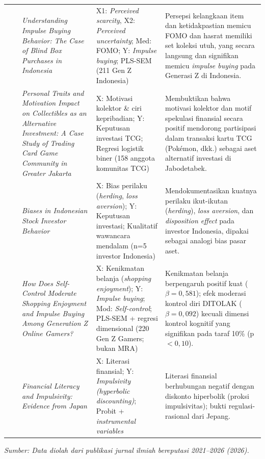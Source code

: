 \documentclass[12pt,a4paper]{article}
\numberwithin{equation}{section}
\numberwithin{table}{section}
\numberwithin{figure}{section}
\begin{document}
\begin{longtable}{>{\centering\arraybackslash}p{0.5cm} >{\raggedright\arraybackslash}p{2.3cm} >{\raggedright\arraybackslash}p{3.2cm} >{\raggedright\arraybackslash}p{2.6cm} >{\raggedright\arraybackslash}p{3.9cm}}
\addlinespace[4pt]
6 & \citet{dewi2026understanding} & \emph{Understanding Impulse Buying Behavior: The Case of Blind Box Purchases in Indonesia} & X1: \emph{Perceived scarcity}, X2: \emph{Perceived uncertainty}; Med: FOMO; Y: \emph{Impulse buying}; PLS-SEM (211 Gen Z Indonesia) & Persepsi kelangkaan item dan ketidakpastian memicu FOMO dan hasrat memiliki set koleksi utuh, yang secara langsung dan signifikan memicu \emph{impulse buying} pada Generasi Z di Indonesia. \\
\addlinespace[4pt]
7 & \citet{aryadi2024personal} & \emph{Personal Traits and Motivation Impact on Collectibles as an Alternative Investment: A Case Study of Trading Card Game Community in Greater Jakarta} & X: Motivasi kolektor \& ciri kepribadian; Y: Keputusan investasi TCG; Regresi logistik biner (158 anggota komunitas TCG) & Membuktikan bahwa motivasi kolektor dan motif spekulasi finansial secara positif mendorong partisipasi dalam transaksi kartu TCG (Pok\'emon, dkk.) sebagai aset alternatif investasi di Jabodetabek. \\
\addlinespace[4pt]
8 & \citet{colline2024biases} & \emph{Biases in Indonesian Stock Investor Behavior} & X: Bias perilaku (\emph{herding}, \emph{loss aversion}); Y: Keputusan investasi; Kualitatif wawancara mendalam (n=5 investor Indonesia) & Mendokumentasikan kuatnya perilaku ikut-ikutan (\emph{herding}), \emph{loss aversion}, dan \emph{disposition effect} pada investor Indonesia, dipakai sebagai analogi bias pasar aset. \\
\addlinespace[4pt]
9 & \citet{artadita2024how} & \emph{How Does Self-Control Moderate Shopping Enjoyment and Impulse Buying Among Generation Z Online Gamers?} & X: Kenikmatan belanja (\emph{shopping enjoyment}); Y: \emph{Impulse buying}; Mod: \emph{Self-control}; PLS-SEM + regresi dimensional (220 Gen Z Gamers; bukan MRA) & Kenikmatan belanja berpengaruh positif kuat ($\beta=0{,}581$); efek moderasi kontrol diri DITOLAK ($\beta=0{,}092$) kecuali dimensi kontrol kognitif yang signifikan pada taraf 10\% (p$<0{,}10$). \\
\addlinespace[4pt]
10 & \citet{katauke2023financial} & \emph{Financial Literacy and Impulsivity: Evidence from Japan} & X: Literasi finansial; Y: \emph{Impulsivity (hyperbolic discounting)}; Probit + \emph{instrumental variables} & Literasi finansial berhubungan negatif dengan diskonto hiperbolik (proksi impulsivitas); bukti regulasi-rasional dari Jepang. \\
\end{longtable}
\vspace{-0.3cm}
\begin{flushleft}
  \footnotesize\textit{Sumber: Data diolah dari publikasi jurnal ilmiah bereputasi 2021--2026 (2026).}
\end{flushleft}
\endgroup
\end{document}
